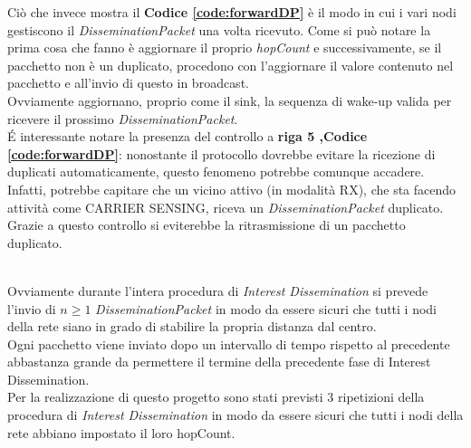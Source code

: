 Ciò che invece mostra il \textbf{Codice \ref{code:forwardDP}} è il modo in cui i vari nodi gestiscono il \textit{DisseminationPacket} una volta ricevuto. Come si può notare la prima cosa che fanno è aggiornare il proprio \textit{hopCount} e successivamente, se il pacchetto non è un duplicato, procedono con l'aggiornare il valore contenuto nel pacchetto e all'invio di questo in broadcast.\\
Ovviamente aggiornano, proprio come il sink, la sequenza di wake-up valida per ricevere il prossimo \textit{DisseminationPacket}. \\
\'E interessante notare la presenza del controllo a \textbf{riga 5 ,Codice \ref{code:forwardDP}}: nonostante  il protocollo dovrebbe evitare la ricezione di duplicati automaticamente, questo fenomeno potrebbe comunque accadere. Infatti, potrebbe capitare che un vicino attivo (in modalità RX), che sta facendo attività come CARRIER SENSING, riceva un \textit{DisseminationPacket} duplicato. Grazie a questo controllo si eviterebbe la ritrasmissione di un pacchetto duplicato.

 \\

Ovviamente durante l'intera procedura di \textit{Interest Dissemination} si prevede l'invio di \(n\geq1\) \textit{DisseminationPacket} in modo da essere sicuri che tutti i nodi della rete siano in grado di stabilire la propria distanza dal centro.\\
Ogni pacchetto viene inviato dopo un intervallo di tempo rispetto al precedente abbastanza grande da permettere il termine della precedente fase di Interest Dissemination. \\
Per la realizzazione di questo progetto sono stati previsti 3 ripetizioni della procedura di \textit{Interest Dissemination} in modo da essere sicuri che tutti i nodi della rete abbiano impostato il loro hopCount.

\newpage

